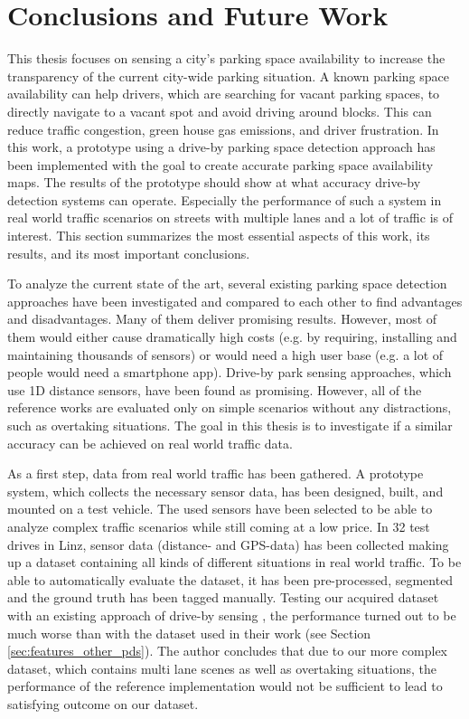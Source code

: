 \chapter{Conclusions and Future Work}
\label{chap:conclusion}



This thesis focuses on sensing a city's parking space availability to increase the transparency of the current city-wide parking situation. 
A known parking space availability can help drivers, which are searching for vacant parking spaces, to directly navigate to a vacant spot and avoid driving around blocks. This can reduce traffic congestion, green house gas emissions, and driver frustration. 
In this work, a prototype using a drive-by parking space detection approach has been implemented with the goal to create accurate parking space availability maps. The results of the prototype should show at what accuracy drive-by detection systems can operate. Especially the performance of such a system in real world traffic scenarios on streets with multiple lanes and a lot of traffic is of interest.
This section summarizes the most essential aspects of this work, its results, and its most important conclusions.



To analyze the current state of the art, several existing parking space detection approaches have been investigated and compared to each other to find advantages and disadvantages.
Many of them deliver promising results. However, most of them would either cause dramatically high costs (e.g. by requiring, installing and maintaining thousands of sensors) or would need a high user base (e.g. a lot of people would need a smartphone app). 
 Drive-by park sensing approaches, which use 1D distance sensors, have been found as promising. However, all of the reference works are evaluated only on simple scenarios without any distractions, such as overtaking situations. 
The goal in this thesis is to investigate if a similar accuracy can be achieved on real world traffic data.

As a first step, data from real world traffic has been gathered. A prototype system, which collects the necessary sensor data, has been designed, built, and mounted on a test vehicle. The used sensors have been selected to be able to analyze complex traffic scenarios while still coming at a low price. 
In 32 test drives in Linz, sensor data (distance- and GPS-data) has been collected making up a dataset containing all kinds of different situations in real world traffic. To be able to automatically evaluate the dataset, it has been pre-processed, segmented and the ground truth has been tagged manually. 
Testing our acquired dataset with an existing approach of drive-by sensing \cite{Mathur:2010:PDS:1814433.1814448}, the performance turned out to be much worse than with the dataset used in their work (see Section \ref{sec:features_other_pds}). The author concludes that due to our more complex dataset, which contains multi lane scenes as well as overtaking situations, the performance of the reference implementation would not be sufficient to lead to satisfying outcome on our dataset.

